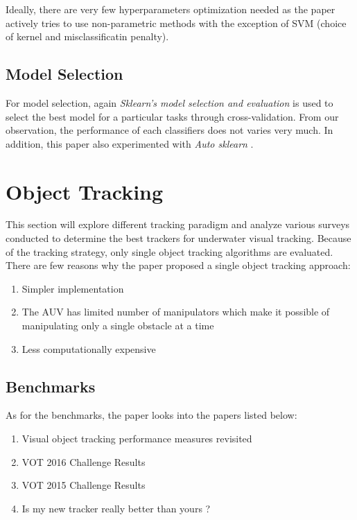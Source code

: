 \documentclass[fypca]{socreport}
\begin{document}
Ideally, there are very few hyperparameters optimization needed as the paper
actively tries to use non-parametric methods with the exception of SVM (choice
of kernel and misclassificatin penalty).

\section{Model Selection}

For model selection, again \textit{Sklearn's model selection and evaluation} is
used to select the best model for a particular tasks through cross-validation.
From our observation, the performance of each classifiers does not varies very
much. In addition, this paper also experimented with \textit{Auto sklearn}
. 


\chapter{Object Tracking}

This section will explore different tracking paradigm
 and analyze various surveys conducted to determine the best trackers
for underwater visual tracking. Because of the tracking strategy, only single
object tracking algorithms are evaluated. There are few reasons why the paper
proposed a single object tracking approach:

\begin{enumerate}
  \item Simpler implementation
  \item The AUV has limited number of manipulators which make it possible of
    manipulating only a single obstacle at a time
  \item Less computationally expensive
\end{enumerate}

\section{Benchmarks}

As for the benchmarks, the paper looks into the papers listed below:

\begin{enumerate}
  \item Visual object tracking performance measures revisited 
  \item VOT 2016 Challenge Results 
  \item VOT 2015 Challenge Results 
  \item Is my new tracker really better than yours ? 
\end{enumerate}
\end{document}
